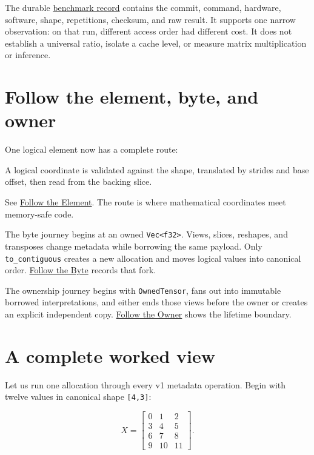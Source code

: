 The durable
\href{https://github.com/hermonai/inside-the-llm-engine/blob/astra-visual-rewrite/research/benchmarks/chapter-05-traversal-order.md}{benchmark
record} contains the commit, command, hardware, software, shape,
repetitions, checksum, and raw result. It supports one narrow
observation: on that run, different access order had different cost. It
does not establish a universal ratio, isolate a cache level, or measure
matrix multiplication or inference.

\section{Follow the element, byte, and
owner}\label{follow-the-element-byte-and-owner}

One logical element now has a complete route:

A logical coordinate is validated against the shape, translated by strides and base offset, then read from the backing slice.

See
\href{https://github.com/hermonai/inside-the-llm-engine/blob/astra-visual-rewrite/diagrams/tensor/follow-the-element.txt}{Follow
the Element}. The route is where mathematical coordinates meet
memory-safe code.

The byte journey begins at an owned
\texttt{Vec\textless{}f32\textgreater{}}. Views, slices, reshapes, and
transposes change metadata while borrowing the same payload. Only
\texttt{to\_contiguous} creates a new allocation and moves logical
values into canonical order.
\href{https://github.com/hermonai/inside-the-llm-engine/blob/astra-visual-rewrite/diagrams/tensor/follow-the-byte.txt}{Follow
the Byte} records that fork.

The ownership journey begins with \texttt{OwnedTensor}, fans out into
immutable borrowed interpretations, and either ends those views before
the owner or creates an explicit independent copy.
\href{https://github.com/hermonai/inside-the-llm-engine/blob/astra-visual-rewrite/diagrams/tensor/follow-the-owner.txt}{Follow
the Owner} shows the lifetime boundary.

\section{A complete worked view}\label{a-complete-worked-view}

Let us run one allocation through every v1 metadata operation. Begin
with twelve values in canonical shape \texttt{{[}4,3{]}}:

\begin{equation}
X=
\begin{bmatrix}
0&1&2\\
3&4&5\\
6&7&8\\
9&10&11
\end{bmatrix}.
\end{equation}

